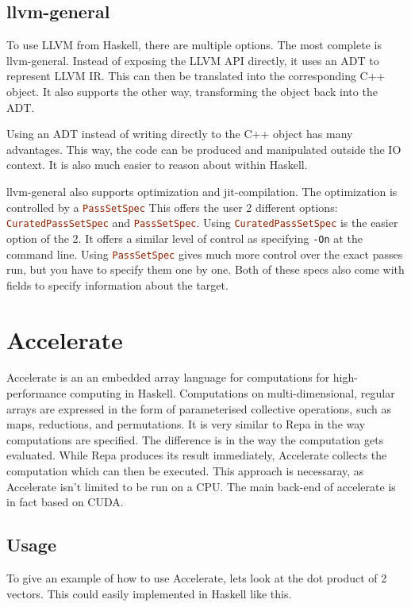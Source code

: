 \documentclass[a4paper,bibliography=totocnumbered,parskip,headsepline]{scrbook}
\begin{document}
\subsection{llvm-general}
To use LLVM from Haskell, there are multiple options.
The most complete is llvm-general.\cite{scarlet2013llvm}
Instead of exposing the LLVM API directly, it uses an ADT to represent LLVM IR.
This can then be translated into the corresponding C++ object.
It also supports the other way, transforming the object back into the ADT.

Using an ADT instead of writing directly to the C++ object has many advantages.
This way, the code can be produced and manipulated outside the IO context.
It is also much easier to reason about within Haskell.

llvm-general also supports optimization and jit-compilation.
The optimization is controlled by a \lstinline[language=haskell]!PassSetSpec!
This offers the user 2 different options: \lstinline[language=haskell]!CuratedPassSetSpec! and \lstinline[language=haskell]!PassSetSpec!.
Using \lstinline[language=haskell]!CuratedPassSetSpec! is the easier option of the 2.
It offers a similar level of control as specifying \texttt{-On} at the command line.
Using \lstinline[language=haskell]!PassSetSpec! gives much more control over the exact passes run, but you have to specify them one by one.
Both of these specs also come with fields to specify information about the target.

\section{Accelerate}
Accelerate\cite{chakravarty2011accelerating,mcdonelloptimising} is an an embedded array language for computations for high-performance computing in Haskell.
Computations on multi-dimensional, regular arrays are expressed in the form of parameterised collective operations, such as maps, reductions, and permutations.
It is very similar to Repa\cite{keller2010regular} in the way computations are specified.
The difference is in the way the computation gets evaluated.
While Repa produces its result immediately, Accelerate collects the computation which can then be executed.
This approach is necessaray, as Accelerate isn't limited to be run on a CPU.
The main back-end of accelerate is in fact based on CUDA.

\subsection{Usage}
To give an example of how to use Accelerate, lets look at the dot product of 2 vectors.
This could easily implemented in Haskell like this.
\end{document}
